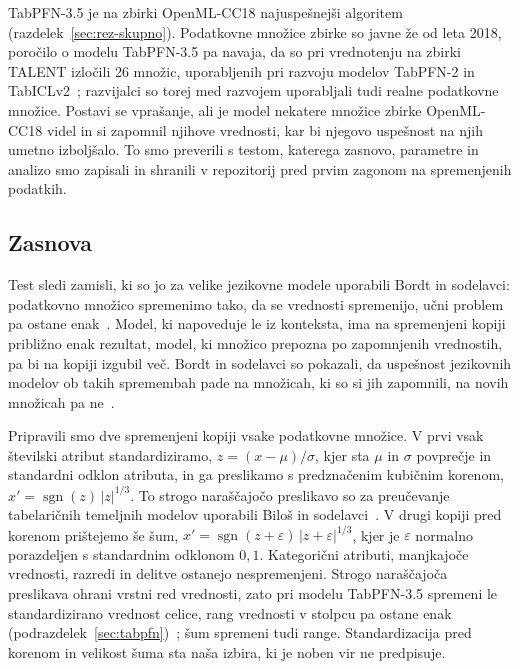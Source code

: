 \documentclass[a4paper,12pt,openright]{book}
\begin{document}
TabPFN-3.5 je na zbirki OpenML-CC18 najuspešnejši algoritem
(razdelek~\ref{sec:rez-skupno}). Podatkovne množice zbirke so javne že od leta
2018, poročilo o modelu TabPFN-3.5 pa navaja, da so pri vrednotenju na zbirki
TALENT izločili 26 množic, uporabljenih pri razvoju modelov TabPFN-2 in
TabICLv2~\cite{jager2026tabpfn35}; razvijalci so torej med razvojem
uporabljali tudi realne podatkovne množice. Postavi se vprašanje, ali je model
nekatere množice zbirke OpenML-CC18 videl in si zapomnil njihove vrednosti, kar
bi njegovo uspešnost na njih umetno izboljšalo. To smo preverili s testom,
katerega zasnovo, parametre in analizo smo zapisali in shranili v repozitorij
pred prvim zagonom na spremenjenih podatkih.

\subsection{Zasnova}

Test sledi zamisli, ki so jo za velike jezikovne modele uporabili Bordt in
sodelavci: podatkovno množico spremenimo tako, da se vrednosti spremenijo,
učni problem pa ostane enak~\cite{bordt2024elephants}. Model, ki napoveduje le
iz konteksta, ima na spremenjeni kopiji približno enak rezultat, model, ki
množico prepozna po zapomnjenih vrednostih, pa bi na kopiji izgubil več.
Bordt in sodelavci so pokazali, da uspešnost jezikovnih modelov ob takih
spremembah pade na množicah, ki so si jih zapomnili, na novih množicah pa
ne~\cite{bordt2024elephants}.

Pripravili smo dve spremenjeni kopiji vsake podatkovne množice. V prvi vsak
številski atribut standardiziramo, $z = (x - \mu)/\sigma$, kjer sta $\mu$ in
$\sigma$ povprečje in standardni odklon atributa, in ga preslikamo s
predznačenim kubičnim korenom, $x' = \operatorname{sgn}(z)\,|z|^{1/3}$. To
strogo naraščajočo preslikavo so za preučevanje tabelaričnih temeljnih modelov
uporabili Biloš in sodelavci~\cite{bilos2026mechanistic}. V drugi kopiji pred
korenom prištejemo še šum, $x' = \operatorname{sgn}(z + \varepsilon)\,|z +
\varepsilon|^{1/3}$, kjer je $\varepsilon$ normalno porazdeljen s standardnim
odklonom $0{,}1$. Kategorični atributi, manjkajoče vrednosti, razredi in
delitve ostanejo nespremenjeni. Strogo naraščajoča preslikava ohrani vrstni red
vrednosti, zato pri modelu TabPFN-3.5 spremeni le standardizirano vrednost
celice, rang vrednosti v stolpcu pa ostane enak
(podrazdelek~\ref{sec:tabpfn})~\cite{jager2026tabpfn35}; šum spremeni tudi
range. Standardizacija pred korenom in velikost šuma sta naša izbira, ki je
noben vir ne predpisuje.
\end{document}

